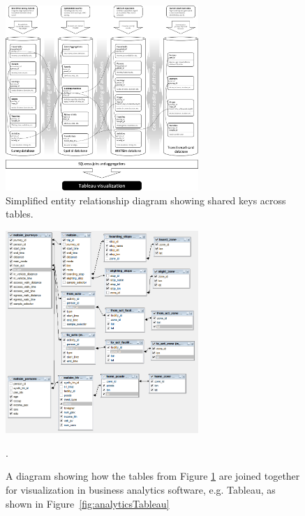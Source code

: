 \begin{figure}
\label{fig:analyticsERD}
\begin{center} \includegraphics[width=0.65\textwidth, angle=0]{extending/figures/businessanalytics/schema} \end{center}
\caption{Simplified entity relationship diagram showing shared keys across tables.}
\end{figure}

\begin{figure}
\label{fig:analyticsFramework}
\begin{center} \includegraphics[width=0.65\textwidth, angle=0]{extending/figures/businessanalytics/join} \end{center}
\caption{A diagram showing how the tables from Figure \ref{fig:analyticsERD} are joined together for visualization in business analytics software, e.g. Tableau, as shown in Figure~\ref{fig:analyticsTableau}}.
\end{figure}

